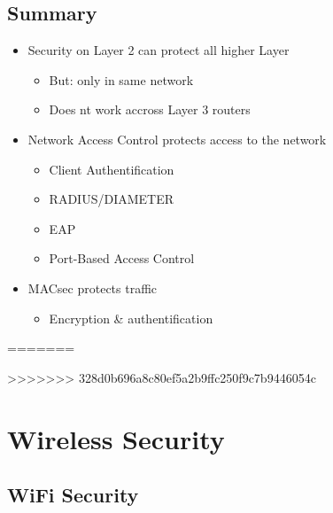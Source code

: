  \subsection{Summary}
\begin{itemize}
  \item Security on Layer 2 can protect all higher Layer
    \begin{itemize}
      \item But: only in same network
      \item Does nt work accross Layer 3 routers
    \end{itemize}
  \item Network Access Control protects access to the network
    \begin{itemize}
      \item Client Authentification
      \item RADIUS/DIAMETER
      \item EAP
      \item Port-Based Access Control
    \end{itemize}
  \item MACsec protects traffic
  \begin{itemize}
    \item Encryption \& authentification
  \end{itemize}
\end{itemize}
=======

>>>>>>> 328d0b696a8c80ef5a2b9ffc250f9c7b9446054c
\section{Wireless Security}
\subsection{WiFi Security}

